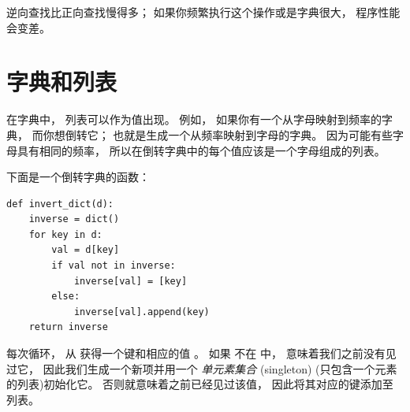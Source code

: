 逆向查找比正向查找慢得多； 如果你频繁执行这个操作或是字典很大， 程序性能会变差。

\section{字典和列表}
\label{invert}


在字典中， 列表可以作为值出现。
例如， 如果你有一个从字母映射到频率的字典，  而你想倒转它；
也就是生成一个从频率映射到字母的字典。
因为可能有些字母具有相同的频率， 所以在倒转字典中的每个值应该是一个字母组成的列表。

  


下面是一个倒转字典的函数：

\begin{lstlisting}
def invert_dict(d):
    inverse = dict()
    for key in d:
        val = d[key]
        if val not in inverse:
            inverse[val] = [key]
        else:
            inverse[val].append(key)
    return inverse
\end{lstlisting}

%

每次循环，   从  获得一个键和相应的值  。
如果  不在  中， 意味着我们之前没有见过它，
因此我们生成一个新项并用一个 {\em 单元素集合} (singleton) (只包含一个元素的列表)初始化它。   否则就意味着之前已经见过该值， 因此将其对应的键添加至列表。

